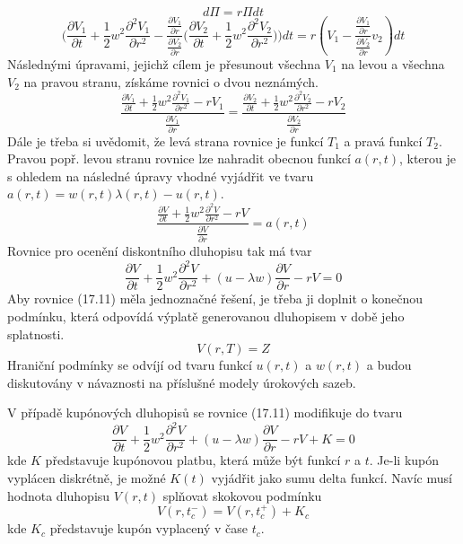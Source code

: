 \documentclass[a4paper]{book}
\begin{document}
\begin{equation*}
d \Pi = r \Pi dt
\end{equation*}
\begin{equation*}
\Bigg( \frac{\partial V_1}{\partial t} + \frac{1}{2}w^2\frac{\partial^2 V_1}{\partial r^2} - \frac{\frac{\partial V_1}{\partial r}}{\frac{\partial V_2}{\partial r}}\Bigg( \frac{\partial V_2}{\partial t} + \frac{1}{2}w^2\frac{\partial^2 V_2}{\partial r^2}\Bigg) \Bigg)dt = r (V_1 - \frac{\frac{\partial V_1}{\partial r}}{\frac{\partial V_2}{\partial r}} v_2) dt
\end{equation*}
Následnými úpravami, jejichž cílem je přesunout všechna $V_1$ na levou a všechna $V_2$ na pravou stranu, získáme rovnici o dvou neznámých.
\begin{equation*}
\frac{\frac{\partial V_1}{\partial t} + \frac{1}{2}w^2\frac{\partial^2 V_1}{\partial r^2} - r V_1}{\frac{\partial V_1}{\partial r}} = \frac{\frac{\partial V_2}{\partial t} + \frac{1}{2}w^2\frac{\partial^2 V_2}{\partial r^2} - r V_2}{\frac{\partial V_2}{\partial r}}
\end{equation*}
Dále je třeba si uvědomit, že levá strana rovnice je funkcí $T_1$ a pravá funkcí $T_2$. Pravou popř. levou stranu rovnice lze nahradit obecnou funkcí $a(r,t)$, kterou je s ohledem na následné úpravy vhodné vyjádřit ve tvaru $a(r,t) = w(r,t)\lambda(r,t) - u(r,t)$.
\begin{equation*}
\frac{\frac{\partial V}{\partial t} + \frac{1}{2}w^2\frac{\partial^2 V}{\partial r^2} - r V}{\frac{\partial V}{\partial r}} = a(r,t)
\end{equation*}
Rovnice pro ocenění diskontního dluhopisu tak má tvar
\begin{equation}
\frac{\partial V}{\partial t} + \frac{1}{2}w^2\frac{\partial^2 V}{\partial r^2} + (u - \lambda w)\frac{\partial V}{\partial r} - rV = 0
\end{equation}
Aby rovnice (17.11) měla jednoznačné řešení, je třeba ji doplnit o konečnou podmínku, která odpovídá výplatě generovanou dluhopisem v době jeho splatnosti.
\begin{equation*}
V(r,T) = Z
\end{equation*}
Hraniční podmínky se odvíjí od tvaru funkcí $u(r,t)$ a $w(r,t)$ a budou diskutovány v návaznosti na příslušné modely úrokových sazeb.

V případě kupónových dluhopisů se rovnice (17.11) modifikuje do tvaru
\begin{equation*}
\frac{\partial V}{\partial t} + \frac{1}{2}w^2\frac{\partial^2 V}{\partial r^2} + (u - \lambda w)\frac{\partial V}{\partial r} - rV + K= 0
\end{equation*}
kde $K$ představuje kupónovou platbu, která může být funkcí $r$ a $t$. Je-li kupón vyplácen diskrétně, je možné $K(t)$ vyjádřit jako sumu delta funkcí. Navíc musí hodnota dluhopisu $V(r,t)$ splňovat skokovou podmínku
\begin{equation*}
V(r, t_c^{-}) = V(r, t_c^{+}) + K_c
\end{equation*}
kde $K_c$ představuje kupón vyplacený v čase $t_c$.
\end{document}
